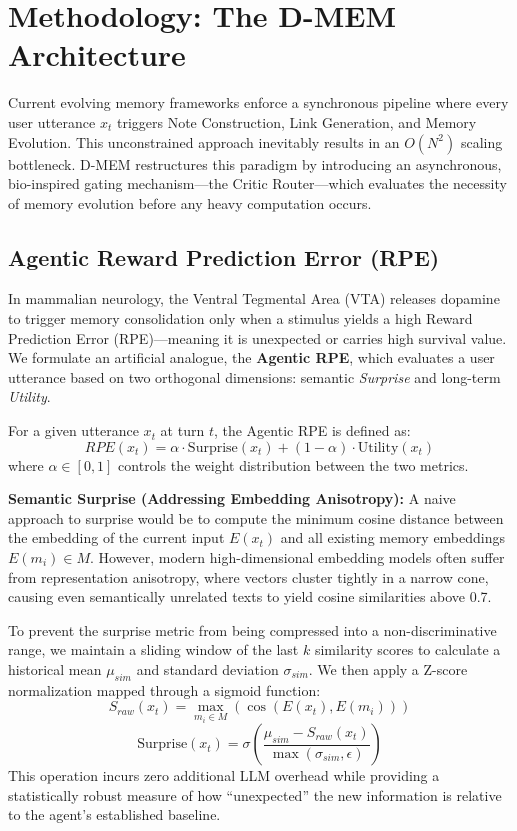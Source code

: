 \documentclass{article}
\begin{document}
\section{Methodology: The D-MEM Architecture}

Current evolving memory frameworks enforce a synchronous pipeline where every user utterance $x_t$ triggers Note Construction, Link Generation, and Memory Evolution. This unconstrained approach inevitably results in an $O(N^2)$ scaling bottleneck. D-MEM restructures this paradigm by introducing an asynchronous, bio-inspired gating mechanism---the Critic Router---which evaluates the necessity of memory evolution before any heavy computation occurs.

\subsection{Agentic Reward Prediction Error (RPE)}

In mammalian neurology, the Ventral Tegmental Area (VTA) releases dopamine to trigger memory consolidation only when a stimulus yields a high Reward Prediction Error (RPE)---meaning it is unexpected or carries high survival value. We formulate an artificial analogue, the \textbf{Agentic RPE}, which evaluates a user utterance based on two orthogonal dimensions: semantic \textit{Surprise} and long-term \textit{Utility}.

For a given utterance $x_t$ at turn $t$, the Agentic RPE is defined as:
$$RPE(x_t) = \alpha \cdot \text{Surprise}(x_t) + (1 - \alpha) \cdot \text{Utility}(x_t)$$
where $\alpha \in [0, 1]$ controls the weight distribution between the two metrics.

\textbf{Semantic Surprise (Addressing Embedding Anisotropy):}
A naive approach to surprise would be to compute the minimum cosine distance between the embedding of the current input $E(x_t)$ and all existing memory embeddings $E(m_i) \in M$. However, modern high-dimensional embedding models often suffer from representation anisotropy, where vectors cluster tightly in a narrow cone, causing even semantically unrelated texts to yield cosine similarities above 0.7. 

To prevent the surprise metric from being compressed into a non-discriminative range, we maintain a sliding window of the last $k$ similarity scores to calculate a historical mean $\mu_{sim}$ and standard deviation $\sigma_{sim}$. We then apply a Z-score normalization mapped through a sigmoid function:
$$S_{raw}(x_t) = \max_{m_i \in M} (\cos(E(x_t), E(m_i)))$$
$$\text{Surprise}(x_t) = \sigma\left(\frac{\mu_{sim} - S_{raw}(x_t)}{\max(\sigma_{sim}, \epsilon)}\right)$$
This operation incurs zero additional LLM overhead while providing a statistically robust measure of how ``unexpected'' the new information is relative to the agent's established baseline.
\end{document}
